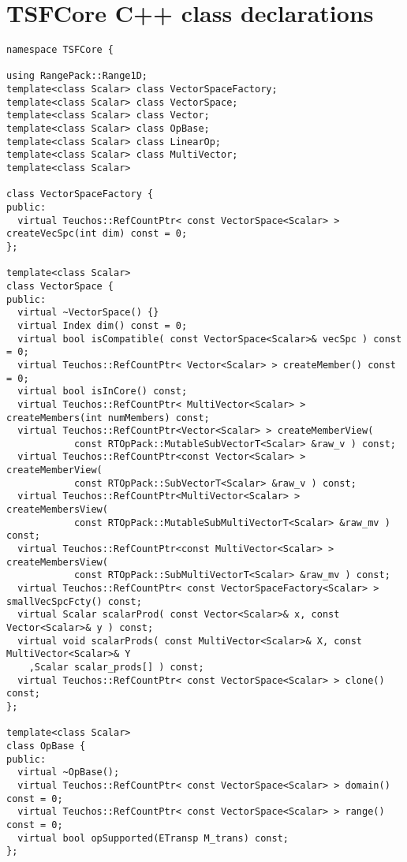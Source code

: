 %
\section{TSFCore C++ class declarations}
\label{app:tsfcore_classes}
%

{\scriptsize\begin{verbatim}
namespace TSFCore {

using RangePack::Range1D;
template<class Scalar> class VectorSpaceFactory;
template<class Scalar> class VectorSpace;
template<class Scalar> class Vector;
template<class Scalar> class OpBase;
template<class Scalar> class LinearOp;
template<class Scalar> class MultiVector;
template<class Scalar>

class VectorSpaceFactory {
public:
  virtual Teuchos::RefCountPtr< const VectorSpace<Scalar> > createVecSpc(int dim) const = 0;
};

template<class Scalar>
class VectorSpace {
public:
  virtual ~VectorSpace() {}
  virtual Index dim() const = 0;
  virtual bool isCompatible( const VectorSpace<Scalar>& vecSpc ) const = 0;
  virtual Teuchos::RefCountPtr< Vector<Scalar> > createMember() const = 0;
  virtual bool isInCore() const;
  virtual Teuchos::RefCountPtr< MultiVector<Scalar> > createMembers(int numMembers) const;
  virtual Teuchos::RefCountPtr<Vector<Scalar> > createMemberView(
            const RTOpPack::MutableSubVectorT<Scalar> &raw_v ) const;
  virtual Teuchos::RefCountPtr<const Vector<Scalar> > createMemberView(
            const RTOpPack::SubVectorT<Scalar> &raw_v ) const;
  virtual Teuchos::RefCountPtr<MultiVector<Scalar> > createMembersView(
            const RTOpPack::MutableSubMultiVectorT<Scalar> &raw_mv ) const;
  virtual Teuchos::RefCountPtr<const MultiVector<Scalar> > createMembersView(
            const RTOpPack::SubMultiVectorT<Scalar> &raw_mv ) const;
  virtual Teuchos::RefCountPtr< const VectorSpaceFactory<Scalar> > smallVecSpcFcty() const;
  virtual Scalar scalarProd( const Vector<Scalar>& x, const Vector<Scalar>& y ) const;
  virtual void scalarProds( const MultiVector<Scalar>& X, const MultiVector<Scalar>& Y
    ,Scalar scalar_prods[] ) const;
  virtual Teuchos::RefCountPtr< const VectorSpace<Scalar> > clone() const;
};

template<class Scalar>
class OpBase {
public:
  virtual ~OpBase();
  virtual Teuchos::RefCountPtr< const VectorSpace<Scalar> > domain() const = 0;
  virtual Teuchos::RefCountPtr< const VectorSpace<Scalar> > range() const = 0;
  virtual bool opSupported(ETransp M_trans) const;
};


\end{verbatim}}
